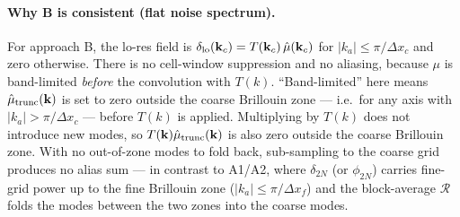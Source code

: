 \documentclass[12pt]{article}
\newcommand{\R}{\mathcal{R}}
\begin{document}
\paragraph{Why B is consistent (flat noise spectrum).}
For approach B, the lo-res field is
$\delta_{\rm lo}(\mathbf k_c) = T(\mathbf k_c)\,\hat\mu(\mathbf k_c)$
for $|k_a|\le\pi/\Delta x_c$ and zero otherwise. There is no cell-window
suppression and no aliasing, because $\mu$ is band-limited
\emph{before} the convolution with $T(k)$. ``Band-limited'' here means
$\hat\mu_{\rm trunc}(\mathbf k)$ is set to zero outside the coarse
Brillouin zone --- i.e.\ for any axis with $|k_a| > \pi/\Delta x_c$ ---
before $T(k)$ is applied. Multiplying by $T(k)$ does not introduce new
modes, so $T(\mathbf k)\hat\mu_{\rm trunc}(\mathbf k)$ is also zero
outside the coarse Brillouin zone. With no out-of-zone modes to fold
back, sub-sampling to the coarse grid produces no alias sum --- in
contrast to A1/A2, where $\delta_{2N}$ (or $\phi_{2N}$) carries
fine-grid power up to the fine Brillouin zone
($|k_a|\le\pi/\Delta x_f$) and the block-average $\R$ folds the modes
between the two zones into the coarse modes.
\end{document}

